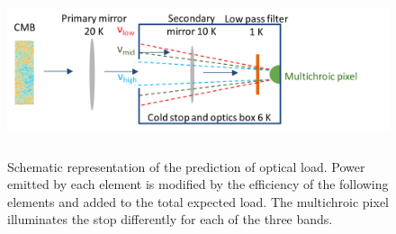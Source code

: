 \documentclass[]{spie}  %
\begin{document}
\begin{figure} [ht]
\begin{center}
\hspace{1cm} \includegraphics[height=5cm]{load_calc_MCP.png}
\end{center}
\caption[load] { \label{fig:load} 
Schematic representation of the prediction of optical load.  Power emitted by each element is modified by the efficiency of 
the following elements and added to the total expected load.  The multichroic pixel illuminates the stop differently for 
each of the three bands. }
\end{figure} 
%
\end{document}
